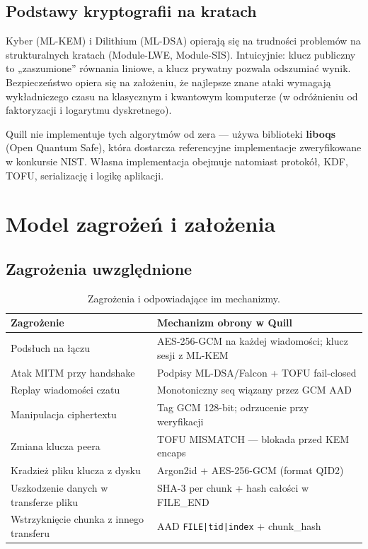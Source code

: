 \documentclass[12pt,a4paper]{article}
\begin{document}
\subsection{Podstawy kryptografii na kratach}

Kyber (ML-KEM) i Dilithium (ML-DSA) opierają się na trudności problemów na strukturalnych kratach (Module-LWE, Module-SIS). Intuicyjnie: klucz publiczny to „zaszumione'' równania liniowe, a klucz prywatny pozwala odszumiać wynik. Bezpieczeństwo opiera się na założeniu, że najlepsze znane ataki wymagają wykładniczego czasu na klasycznym i kwantowym komputerze (w odróżnieniu od faktoryzacji i logarytmu dyskretnego).

Quill nie implementuje tych algorytmów od zera --- używa biblioteki \textbf{liboqs} (Open Quantum Safe), która dostarcza referencyjne implementacje zweryfikowane w konkursie NIST. Własna implementacja obejmuje natomiast protokół, KDF, TOFU, serializację i logikę aplikacji.

\section{Model zagrożeń i założenia}

\subsection{Zagrożenia uwzględnione}

\begin{table}[H]
\centering
\small
\begin{tabular}{@{}p{3.5cm}p{9cm}@{}}
\toprule
\textbf{Zagrożenie} & \textbf{Mechanizm obrony w Quill} \\
\midrule
Podsłuch na łączu & AES-256-GCM na każdej wiadomości; klucz sesji z ML-KEM \\
Atak MITM przy handshake & Podpisy ML-DSA/Falcon + TOFU fail-closed \\
Replay wiadomości czatu & Monotoniczny seq wiązany przez GCM AAD \\
Manipulacja ciphertextu & Tag GCM 128-bit; odrzucenie przy weryfikacji \\
Zmiana klucza peera & TOFU MISMATCH --- blokada przed KEM encaps \\
Kradzież pliku klucza z dysku & Argon2id + AES-256-GCM (format QID2) \\
Uszkodzenie danych w transferze pliku & SHA-3 per chunk + hash całości w FILE\_END \\
Wstrzyknięcie chunka z innego transferu & AAD \texttt{FILE|tid|index} + chunk\_hash \\
\bottomrule
\end{tabular}
\caption{Zagrożenia i odpowiadające im mechanizmy.}
\end{table}
\end{document}
